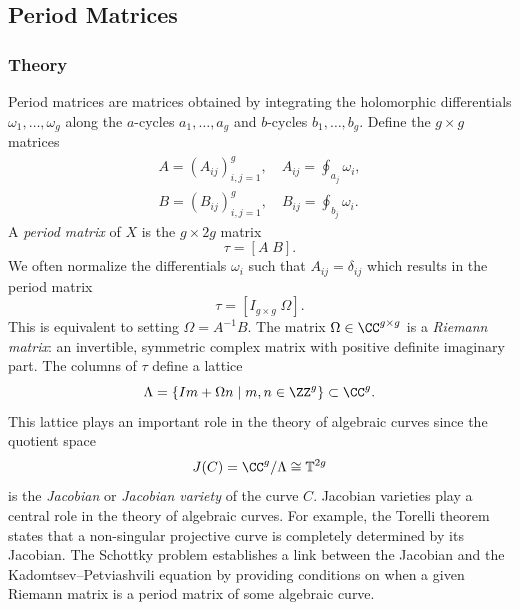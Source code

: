 \subsection{Period Matrices} \label{sec: period-matrices}

%
\subsubsection*{Theory}
%

Period matrices are matrices obtained by integrating the holomorphic
differentials $\omega_1, \ldots, \omega_g$ along the $a$-cycles
$a_1,\ldots,a_g$ and $b$-cycles $b_1,\ldots,b_g$. Define the $g \times g$
matrices
\begin{align*}
    A = \left( A_{ij} \right)_{i,j=1}^g,
    \quad A_{ij} = \oint_{a_j} \omega_i, \\
    B = \left( B_{ij} \right)_{i,j=1}^g,
    \quad B_{ij} = \oint_{b_j} \omega_i.
\end{align*}
A {\it period matrix} of $X$ is the $g \times 2g$ matrix
\[
  \tau = \left[ A \; B \right].
\]
We often normalize the differentials $\omega_i$ such that $A_{ij} =
\delta_{ij}$ which results in the period matrix
\begin{equation} \label{eqn: period-matrix}
  \tau = \left[ I_{g \times g} \; \Omega \right].
\end{equation}
This is equivalent to setting $\Omega = A^{-1}B$. The matrix $\Omega \in
\CC^{g \times g}$ is a {\it Riemann matrix}: an invertible, symmetric
complex matrix with positive definite imaginary part. The columns of
$\tau$ define a lattice
\[
    \Lambda = \{I m + \Omega n \; | \; m,n \in \ZZ^g\} \subset \CC^g.
\]
This lattice plays an important role in the theory of algebraic curves
since the quotient space
\begin{equation} \label{eqn: jacobian}
  J(C) = \CC^g / \Lambda \cong \mathbb{T}^{2g}
\end{equation}
is the {\it Jacobian} or {\it Jacobian variety} of the curve
$C$. Jacobian varieties play a central role in the theory of algebraic
curves. For example, the Torelli theorem \cite{Mumford99} states that a
non-singular projective curve is completely determined by its
Jacobian. The Schottky problem establishes a link between the Jacobian
and the Kadomtsev--Petviashvili equation by providing conditions on when
a given Riemann matrix is a period matrix of some algebraic curve.

